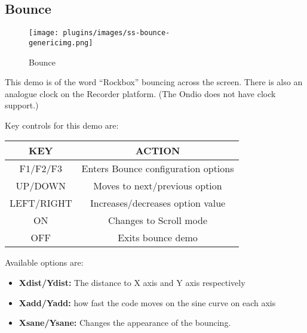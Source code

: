 \subsection{Bounce}
\begin{figure}[h]
\begin{center}
\texttt{[image: plugins/images/ss-bounce-\\genericimg.png]}
\end{center}
\caption{Bounce}
\end{figure}

This demo is of the word ``Rockbox'' bouncing across the screen.  There
is also an analogue clock on the Recorder platform.  (The Ondio does
not have clock support.)

Key controls for this demo are:

\begin{table}[h!]
\begin{center}
\begin{tabular}{|c|c|}
\hline
KEY & ACTION \\\hline
F1/F2/F3 & Enters Bounce configuration options \\\hline
UP/DOWN & Moves to next/previous option \\\hline
LEFT/RIGHT & Increases/decreases option value \\\hline
ON & Changes to Scroll mode \\\hline
OFF & Exits bounce demo\\\hline
\end{tabular}
\end{center}
\end{table}
Available options are:

\begin{itemize}
\item \textbf{Xdist/Ydist:} The distance to X axis and Y axis
respectively
\item \textbf{Xadd/Yadd:} how fast the code moves on the sine curve on
each axis
\item \textbf{Xsane/Ysane:} Changes the appearance of the bouncing.
\end{itemize}